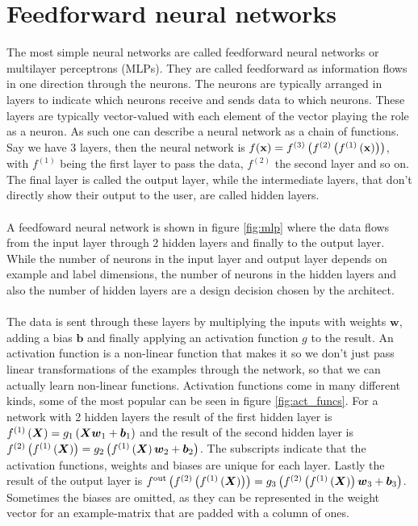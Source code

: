 \section{Feedforward neural networks} \label{sec:feedforward_nn}
The most simple neural networks are called feedforward neural networks or multilayer perceptrons (MLPs). They are called feedforward as information flows in one direction through the neurons. The neurons are typically arranged in layers to indicate which neurons receive and sends data to which neurons. These layers are typically vector-valued with each element of the vector playing the role as a neuron. As such one can describe a neural network as a chain of functions. Say we have 3 layers, then the neural network is $f(\mathbf{x}) = f^{(3)}\left (f^{(2)}\left (f^{(1)}\left (\mathbf{x}\right)\right)\right)$, with $f^{(1)}$ being the first layer to pass the data, $f^{(2)}$ the second layer and so on. The final layer is called the output layer, while the intermediate layers, that don't directly show their output to the user, are called hidden layers. \\
\\
A feedfoward neural network is shown in figure \ref{fig:mlp} where the data flows from the input layer through 2 hidden layers and finally to the output layer. While the number of neurons in the input layer and output layer depends on example and label dimensions, the number of neurons in the hidden layers and also the number of hidden layers are a design decision chosen by the architect. \\
\\
The data is sent through these layers by multiplying the inputs with weights $\boldsymbol{w}$, adding a bias $\boldsymbol{b}$ and finally applying an activation function $g$ to the result. An activation function is a non-linear function that makes it so we don't just pass linear transformations of the examples through the network, so that we can actually learn non-linear functions. Activation functions come in many different kinds, some of the most popular can be seen in figure \ref{fig:act_funcs}. For a network with 2 hidden layers the result of the first hidden layer is $f^{(1)}\left (\boldsymbol{X}\right) = g_1 \left (\boldsymbol{X} \boldsymbol{w}_1 + \boldsymbol{b}_1\right)$ and the result of the second hidden layer is $f^{(2)} \left (f^{(1)}\left (\boldsymbol{X}\right)\right) = g_2 \left (f^{(1)}\left (\boldsymbol{X}\right) \boldsymbol{w}_2 + \boldsymbol{b}_2\right)$. The subscripts indicate that the activation functions, weights and biases are unique for each layer. Lastly the result of the output layer is $f^{\text{out}} \left (f^{(2)} \left (f^{(1)}\left (\boldsymbol{X}\right)\right)\right) = g_3 \left (f^{(2)} \left (f^{(1)}\left (\boldsymbol{X}\right)\right) \boldsymbol{w}_3 + \boldsymbol{b}_3\right)$. Sometimes the biases are omitted, as they can be represented in the weight vector for an example-matrix that are padded with a column of ones. \\

